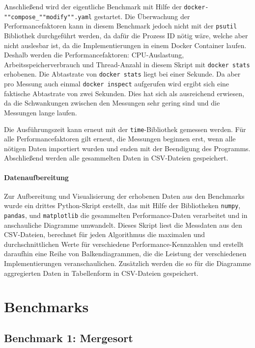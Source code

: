 \documentclass[fontsize=12pt,paper=a4,twoside=semi,parskip=half-,headsepline,headinclude]{scrreprt}
\begin{document}
Anschließend wird der eigentliche Benchmark mit Hilfe der \texttt{docker-""compose\_""modify"".yaml} gestartet. Die Überwachung der Performancefaktoren kann in diesem Benchmark jedoch nicht mit der \texttt{psutil} Bibliothek durchgeführt werden, da dafür die Prozess ID nötig wäre, welche aber nicht auslesbar ist, da die Implementierungen in einem Docker Container laufen. Deshalb werden die Performancefaktoren: CPU-Auslastung, Arbeitsspeicherverbrauch und Thread-Anzahl in diesem Skript mit \texttt{docker stats} erhobenen. Die Abtastrate von \texttt{docker stats} liegt bei einer Sekunde. Da aber pro Messung auch einmal \texttt{docker inspect} aufgerufen wird ergibt sich eine faktische Abtastrate von zwei Sekunden. Dies hat sich als ausreichend erwiesen, da die Schwankungen zwischen den Messungen sehr gering sind und die Messungen lange laufen. 

Die Ausführungszeit kann erneut mit der \texttt{time}-Bibliothek gemessen werden. Für alle Performancefaktoren gilt erneut, die Messungen beginnen erst, wenn alle nötigen Daten importiert wurden und enden mit der Beendigung des Programms. Abschließend werden alle gesammelten Daten in CSV-Dateien gespeichert. 

\subsubsection{Datenaufbereitung}

Zur Aufbereitung und Visualisierung der erhobenen Daten aus den Benchmarks wurde ein drittes Python-Skript erstellt, das mit Hilfe der Bibliotheken \texttt{numpy}, \texttt{pandas}, und \texttt{matplotlib} die gesammelten Performance-Daten verarbeitet und in anschauliche Diagramme umwandelt. Dieses Skript liest die Messdaten aus den CSV-Dateien, berechnet für jeden Algorithmus die maximalen und durchschnittlichen Werte für verschiedene Performance-Kennzahlen und erstellt daraufhin eine Reihe von Balkendiagrammen, die die Leistung der verschiedenen Implementierungen veranschaulichen. Zusätzlich werden die so für die Diagramme aggregierten Daten in Tabellenform in CSV-Dateien gespeichert.

\chapter{Benchmarks}

\section{Benchmark 1: Mergesort}
\end{document}
